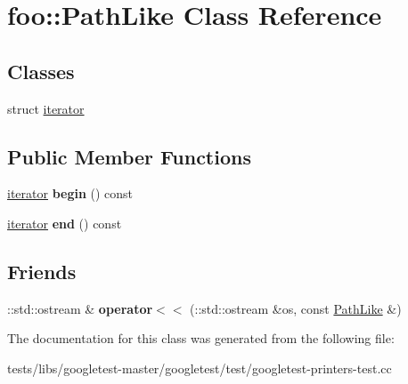 \hypertarget{classfoo_1_1PathLike}{}\section{foo\+:\+:Path\+Like Class Reference}
\label{classfoo_1_1PathLike}
\subsection*{Classes}
\begin{DoxyCompactItemize}
\item 
struct \hyperlink{structfoo_1_1PathLike_1_1iterator}{iterator}
\end{DoxyCompactItemize}
\subsection*{Public Member Functions}
\begin{DoxyCompactItemize}
\item 
\mbox{\label{classfoo_1_1PathLike_a7ca8b63139fd6fcada55fbf13ccf9c83}} 
\hyperlink{structfoo_1_1PathLike_1_1iterator}{iterator} {\bfseries begin} () const
\item 
\mbox{\label{classfoo_1_1PathLike_aca85cd005890f1d19f416ca7e2c95f02}} 
\hyperlink{structfoo_1_1PathLike_1_1iterator}{iterator} {\bfseries end} () const
\end{DoxyCompactItemize}
\subsection*{Friends}
\begin{DoxyCompactItemize}
\item 
\mbox{\label{classfoo_1_1PathLike_ab5544a5497a8a470802bd8fcf97c49da}} 
\+::std\+::ostream \& {\bfseries operator$<$$<$} (\+::std\+::ostream \&os, const \hyperlink{classfoo_1_1PathLike}{Path\+Like} \&)
\end{DoxyCompactItemize}


The documentation for this class was generated from the following file\+:\begin{DoxyCompactItemize}
\item 
tests/libs/googletest-\/master/googletest/test/googletest-\/printers-\/test.\+cc\end{DoxyCompactItemize}

